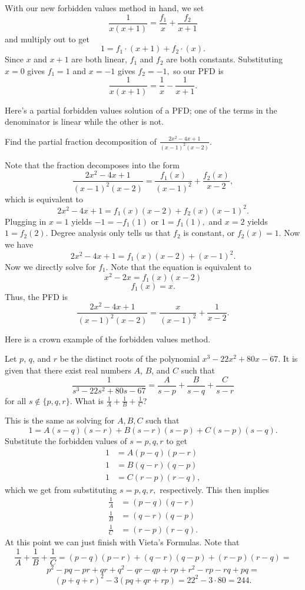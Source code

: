\documentclass{article}
\begin{document}
\begin{sol}
With our new forbidden values method in hand, we set
\[\frac{1}{x(x+1)}=\frac{f_1}{x}+\frac{f_2}{x+1}\]
and multiply out to get
\[1=f_1\cdot (x+1)+f_2\cdot (x).\]
Since $x$ and $x+1$ are both linear, $f_1$ and $f_2$ are both constants. Substituting $x=0$ gives $f_1=1$ and $x=-1$ gives $f_2=-1,$ so our PFD is
\[\frac{1}{x(x+1)}=\frac{1}{x}-\frac{1}{x+1}.\]
\end{sol}

Here's a partial forbidden values solution of a PFD; one of the terms in the denominator is linear while the other is not.

\begin{exam}
Find the partial fraction decomposition of $\frac{2x^2-4x+1}{(x-1)^2(x-2)}.$
\end{exam}

\begin{sol}
Note that the fraction decomposes into the form
\[\frac{2x^2-4x+1}{(x-1)^2(x-2)}=\frac{f_1(x)}{(x-1)^2}+\frac{f_2(x)}{x-2},\]
which is equivalent to
\[2x^2-4x+1=f_1(x)(x-2)+f_2(x)(x-1)^2.\]
Plugging in $x=1$ yields $-1=-f_1(1)$ or $1=f_1(1),$ and $x=2$ yields $1=f_2(2).$ Degree analysis only tells us that $f_2$ is constant, or $f_2(x)=1.$ Now we have
\[2x^2-4x+1=f_1(x)(x-2)+(x-1)^2.\]
Now we directly solve for $f_1.$ Note that the equation is equivalent to
\[x^2-2x=f_1(x)(x-2)\]
\[f_1(x)=x.\]
Thus, the PFD is
\[\frac{2x^2-4x+1}{(x-1)^2(x-2)}=\frac{x}{(x-1)^2}+\frac{1}{x-2}.\]
\end{sol}

Here is a crown example of the forbidden values method.

\begin{exam}[AMC 10A 2019/24]
Let $p$, $q$, and $r$ be the distinct roots of the polynomial $x^3 - 22x^2 + 80x - 67$. It is given that there exist real numbers $A$, $B$, and $C$ such that\[\dfrac{1}{s^3 - 22s^2 + 80s - 67} = \dfrac{A}{s-p} + \dfrac{B}{s-q} + \frac{C}{s-r}\]for all $s\not\in\{p,q,r\}$. What is $\tfrac1A+\tfrac1B+\tfrac1C$?
\end{exam}

\begin{sol}
This is the same as solving for $A,B,C$ such that
\[1=A(s-q)(s-r)+B(s-r)(s-p)+C(s-p)(s-q).\]
Substitute the forbidden values of $s=p,q,r$ to get
\begin{align*}
1&=A(p-q)(p-r) \\
1&=B(q-r)(q-p) \\
1&=C(r-p)(r-q),
\end{align*}
which we get from substituting $s=p,q,r,$ respectively. This then implies
\begin{align*}
\frac{1}{A}&=(p-q)(q-r) \\
\frac{1}{B}&=(q-r)(q-p) \\
\frac{1}{C}&=(r-p)(r-q).
\end{align*}
At this point we can just finish with Vieta's Formulas. Note that
\[\frac{1}{A}+\frac{1}{B}+\frac{1}{C}=(p-q)(p-r)+(q-r)(q-p)+(r-p)(r-q)=\]
\[p^2-pq-pr+qr+q^2-qr-qp+rp+r^2-rp-rq+pq=\]
\[(p+q+r)^2-3(pq+qr+rp)=22^2-3\cdot 80=244.\]
\end{sol}
\end{document}
